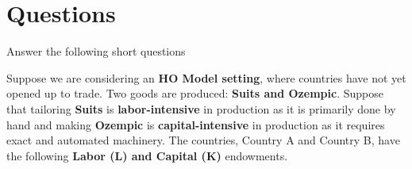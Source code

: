 \documentclass[12pt]{exam}
\begin{document}
\section*{Questions}
\begin{questions}

\question[8]
Answer the following short questions


\newpage 

\question[6]
Suppose we are considering an \textbf{HO Model setting}, where countries have not yet opened up to trade.
Two goods are produced: \textbf{Suits and Ozempic}. 
Suppose that tailoring \textbf{Suits} is \textbf{labor-intensive} in production as it is primarily done by hand and making \textbf{Ozempic} is \textbf{capital-intensive} in production as it requires exact and automated machinery. 
The countries, Country A and Country B, have the following \textbf{Labor (L) and Capital (K)} endowments.



\end{questions}
\end{document}
